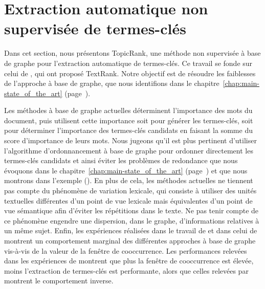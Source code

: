 
  \section{Extraction automatique non supervisée de termes-clés}
  \label{sec:main-automatic_keyphrase_annotation-unsupervised_automatic_keyphrase_extraction}
    Dans cet section, nous présentons TopicRank, une méthode non supervisée à
    base de graphe pour l'extraction automatique de termes-clés. Ce travail se
    fonde sur celui de , qui ont proposé TextRank.
    Notre objectif est de résoudre les faiblesses de l'approche à base de
    graphe, que nous identifions dans le
    chapitre~\ref{chap:main-state_of_the_art}
    (page~\pageref{chap:main-state_of_the_art}).

    Les méthodes à base de graphe actuelles déterminent l'importance des mots du
    document, puis utilisent cette importance soit pour générer les termes-clés,
    soit pour déterminer l'importance des termes-clés candidats en faisant la
    somme du score d'importance de leurs mots. Nous jugeons qu'il est plus
    pertinent d'utiliser l'algorithme d'ordonnancement à base de graphe pour
    ordonner directement les termes-clés candidats et ainsi éviter les problèmes
    de redondance que nous évoquons dans le
    chapitre~\ref{chap:main-state_of_the_art}
    (page~\pageref{chap:main-state_of_the_art}) et que nous montrons dans
    l'exemple 
    (). En plus de cela, les méthodes actuelles ne tiennent pas
    compte du phénomène de variation lexicale, qui consiste à utiliser des
    unités textuelles différentes d'un point de vue lexicale mais équivalentes
    d'un point de vue sémantique afin d'éviter les répétitions dans le texte. Ne
    pas tenir compte de ce phénomène engendre une dispersion, dans le graphe,
    d'informations relatives à un même sujet. Enfin, les expériences réalisées
    dans le travail de  et dans celui de
     montrent un comportement marginal des
    différentes approches à base de graphe vis-à-vis de la valeur de la fenêtre
    de cooccurrence. Les performances relevées dans les expériences de
     montrent que plus la fenêtre de cooccurrence
    est élevée, moins l'extraction de termes-clés est performante, alors que
    celles relevées par  montrent le comportement
    inverse. 

